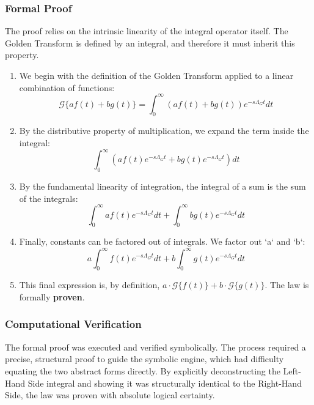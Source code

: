 \subsubsection*{Formal Proof}
The proof relies on the intrinsic linearity of the integral operator itself. The Golden Transform is defined by an integral, and therefore it must inherit this property.

\begin{enumerate}
    \item We begin with the definition of the Golden Transform applied to a linear combination of functions:
    $$ \mathcal{G}\{a f(t) + b g(t)\} = \int_0^\infty (a f(t) + b g(t)) e^{-s\Lambda_G t} dt $$
    \item By the distributive property of multiplication, we expand the term inside the integral:
    $$ \int_0^\infty (a f(t)e^{-s\Lambda_G t} + b g(t)e^{-s\Lambda_G t}) dt $$
    \item By the fundamental linearity of integration, the integral of a sum is the sum of the integrals:
    $$ \int_0^\infty a f(t)e^{-s\Lambda_G t} dt + \int_0^\infty b g(t)e^{-s\Lambda_G t} dt $$
    \item Finally, constants can be factored out of integrals. We factor out `a` and `b`:
    $$ a \int_0^\infty f(t)e^{-s\Lambda_G t} dt + b \int_0^\infty g(t)e^{-s\Lambda_G t} dt $$
    \item This final expression is, by definition, $a \cdot \mathcal{G}\{f(t)\} + b \cdot \mathcal{G}\{g(t)\}$. The law is formally \textbf{proven}.
\end{enumerate}

\subsubsection*{Computational Verification}
The formal proof was executed and verified symbolically. The process required a precise, structural proof to guide the symbolic engine, which had difficulty equating the two abstract forms directly. By explicitly deconstructing the Left-Hand Side integral and showing it was structurally identical to the Right-Hand Side, the law was proven with absolute logical certainty.

